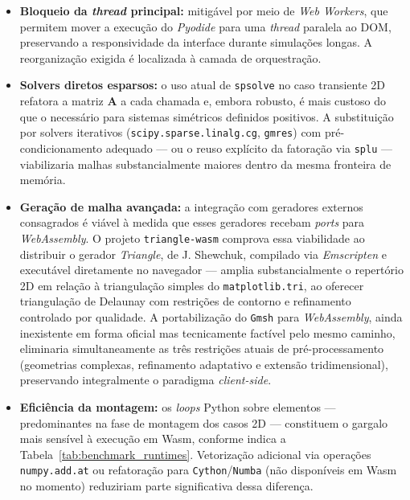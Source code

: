\begin{itemize}
    \item \textbf{Bloqueio da \textit{thread} principal:} mitigável por meio de \textit{Web Workers}, que permitem mover a execução do \textit{Pyodide} para uma \textit{thread} paralela ao DOM, preservando a responsividade da interface durante simulações longas. A reorganização exigida é localizada à camada de orquestração.

    \item \textbf{Solvers diretos esparsos:} o uso atual de \texttt{spsolve} no caso transiente 2D refatora a matriz $\mathbf{A}$ a cada chamada e, embora robusto, é mais custoso do que o necessário para sistemas simétricos definidos positivos. A substituição por solvers iterativos (\texttt{scipy.sparse.linalg.cg}, \texttt{gmres}) com pré-condicionamento adequado --- ou o reuso explícito da fatoração via \texttt{splu} --- viabilizaria malhas substancialmente maiores dentro da mesma fronteira de memória.

    \item \textbf{Geração de malha avançada:} a integração com geradores externos consagrados é viável à medida que esses geradores recebam \textit{ports} para \textit{WebAssembly}. O projeto \texttt{triangle-wasm} \cite{TriangleWasm} comprova essa viabilidade ao distribuir o gerador \textit{Triangle}, de J. Shewchuk, compilado via \textit{Emscripten} e executável diretamente no navegador --- amplia substancialmente o repertório 2D em relação à triangulação simples do \texttt{matplotlib.tri}, ao oferecer triangulação de Delaunay com restrições de contorno e refinamento controlado por qualidade. A portabilização do \texttt{Gmsh} para \textit{WebAssembly}, ainda inexistente em forma oficial mas tecnicamente factível pelo mesmo caminho, eliminaria simultaneamente as três restrições atuais de pré-processamento (geometrias complexas, refinamento adaptativo e extensão tridimensional), preservando integralmente o paradigma \textit{client-side}.

    \item \textbf{Eficiência da montagem:} os \textit{loops} Python sobre elementos --- predominantes na fase de montagem dos casos 2D --- constituem o gargalo mais sensível à execução em Wasm, conforme indica a Tabela~\ref{tab:benchmark_runtimes}. Vetorização adicional via operações \texttt{numpy.add.at} ou refatoração para \texttt{Cython}/\texttt{Numba} (não disponíveis em Wasm no momento) reduziriam parte significativa dessa diferença.
\end{itemize}

